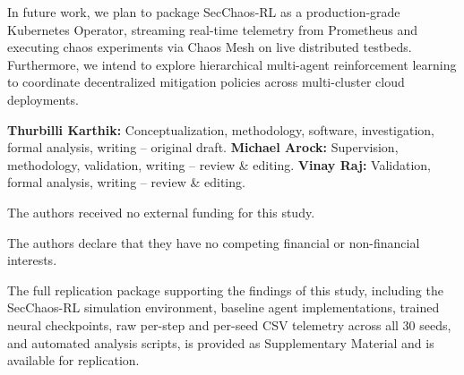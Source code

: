 \documentclass[ASNA,twocolumn]{USG}
\begin{document}
In future work, we plan to package SecChaos-RL as a production-grade Kubernetes Operator, streaming real-time telemetry from Prometheus and executing chaos experiments via Chaos Mesh on live distributed testbeds. Furthermore, we intend to explore hierarchical multi-agent reinforcement learning to coordinate decentralized mitigation policies across multi-cluster cloud deployments.


\textbf{Thurbilli Karthik:} Conceptualization, methodology, software, investigation, formal analysis, writing -- original draft. \textbf{Michael Arock:} Supervision, methodology, validation, writing -- review \& editing. \textbf{Vinay Raj:} Validation, formal analysis, writing -- review \& editing.

The authors received no external funding for this study.

The authors declare that they have no competing financial or non-financial interests.

The full replication package supporting the findings of this study, including the SecChaos-RL simulation environment, baseline agent implementations, trained neural checkpoints, raw per-step and per-seed CSV telemetry across all 30 seeds, and automated analysis scripts, is provided as Supplementary Material and is available for replication.


\end{document}
